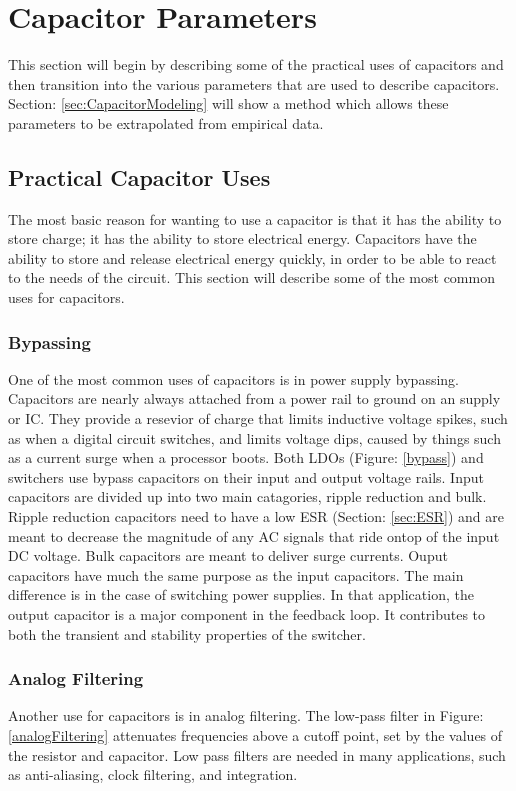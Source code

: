 \section {Capacitor Parameters}
This section will begin by describing some of the practical uses of capacitors and then transition into the various parameters that are used to describe capacitors. Section: \ref{sec:CapacitorModeling} will show a method which allows these parameters to be extrapolated from empirical data.

\subsection{Practical Capacitor Uses}

The most basic reason for wanting to use a capacitor is that it has the ability to store charge; it has the ability to store electrical energy. Capacitors have the ability to store and release electrical energy quickly, in order to be able to react to the needs of the circuit. This section will describe some of the most common uses for capacitors.

\subsubsection{Bypassing}


One of the most common uses of capacitors is in power supply bypassing. Capacitors are nearly always attached from a power rail to ground on an supply or IC. They provide a resevior of charge that limits inductive voltage spikes, such as when a digital circuit switches, and limits voltage dips, caused by things such as a current surge when a processor boots.
Both LDOs (Figure: \ref{bypass}) and switchers use bypass capacitors on their input and output voltage rails. Input capacitors are divided up into two main catagories, ripple reduction and bulk. Ripple reduction capacitors need to have a low ESR (Section: \ref{sec:ESR}) and are meant to decrease the magnitude of any AC signals that ride ontop of the input DC voltage. Bulk capacitors are meant to deliver surge currents. Ouput capacitors have much the same purpose as the input capacitors. The main difference is in the case of switching power supplies. In that application, the output capacitor is a major component in the feedback loop. It contributes to both the transient and stability properties of the switcher.

\subsubsection{Analog Filtering}

Another use for capacitors is in analog filtering. The low-pass filter in Figure: \ref{analogFiltering} attenuates frequencies above a cutoff point, set by the values of the resistor and capacitor. Low pass filters are needed in many applications, such as anti-aliasing, clock filtering, and integration.

